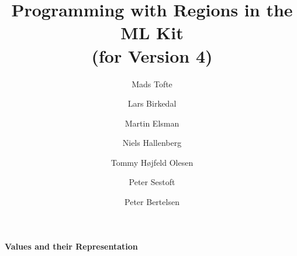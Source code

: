 \documentclass[12pt]{book}
\title{Programming with Regions in the ML Kit\\
(for Version 4)}
\author{Mads Tofte \and Lars Birkedal \and Martin Elsman \and
\and Niels Hallenberg \and Tommy H\o jfeld Olesen \and
Peter Sestoft \and Peter Bertelsen}
\begin{document}











\maketitle

\pagestyle{headings}
\begin{center}
\bf Values and their Representation
\end{center}
\smallskip
\end{document}
